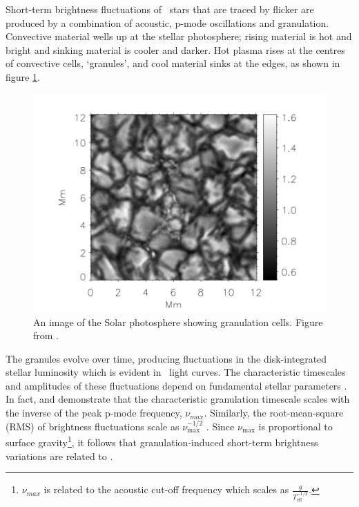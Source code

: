 Short-term brightness fluctuations of \kepler\ stars that are traced by
flicker are produced by a combination of acoustic, p-mode oscillations and
granulation.
Convective material wells up at the stellar photosphere; rising material is
hot and bright and sinking material is cooler and darker.
Hot plasma rises at the centres of convective cells, `granules', and cool
material sinks at the edges, as shown in figure \ref{fig:cegla}.
\begin{figure}
\begin{center}
\includegraphics[width=6in,angle=0,clip=true]{figures/cegla.pdf}
\caption[Granulation on the Solar surface.]
{An image of the Solar photosphere showing granulation cells. Figure from
\citet{Cegla2013}.}
\label{fig:cegla}
\end{center}
\end{figure}
The granules evolve over time, producing fluctuations in the disk-integrated
stellar luminosity which is evident in \kepler\ light curves.
The characteristic timescales and amplitudes of these fluctuations depend on
fundamental stellar parameters \citep[\eg][]{Samadi2013, Samadi2013b}.
In fact, \citet{Kallinger2010} and \citet{Mathur2011} demonstrate that the
characteristic granulation timescale scales with the inverse of the
peak p-mode frequency, $\nu_{max}$.
Similarly, the root-mean-square (RMS) of brightness fluctuations scale as
$\nu_{\mathrm{max}}^{-1/2}$ \citep{Mathur2011, Chaplin2011}.
Since $\nu_{\mathrm{max}}$ is proportional to surface
gravity\footnote{$\nu_{max}$ is related to the acoustic cut-off frequency
which scales as $\frac{g}{T_{\mathrm{eff}}^{-1/2}}$.}, it follows that
granulation-induced short-term brightness variations are related to \logg.
